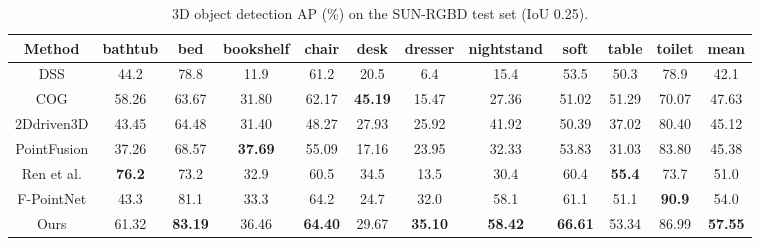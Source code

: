 \documentclass[letterpaper, 10 pt, conference]{ieeeconf}
\begin{document}
\begin{table*}[h]
	\begin{center}
		\begin{tabular}{c|cccccccccc|c}
			\hline
			\multicolumn{1}{c|}{Method}         & bathtub       & bed            & bookshelf      & chair          & desk           & dresser        & nightstand     & soft           & table         & toilet        & mean           \\ \hline
			DSS\cite{song2016deep}              & 44.2          & 78.8           & 11.9           & 61.2           & 20.5           & 6.4            & 15.4           & 53.5           & 50.3          & 78.9          & 42.1           \\
			COG\cite{ren2016three}              & 58.26         & 63.67          & 31.80          & 62.17          & \textbf{45.19} & 15.47          & 27.36          & 51.02          & 51.29         & 70.07         & 47.63          \\
			2Ddriven3D\cite{lahoud20172d}       & 43.45         & 64.48          & 31.40          & 48.27          & 27.93          & 25.92          & 41.92          & 50.39          & 37.02         & 80.40         & 45.12          \\
			PointFusion\cite{xu2018pointfusion} & 37.26         & 68.57          & \textbf{37.69} & 55.09          & 17.16          & 23.95          & 32.33          & 53.83          & 31.03         & 83.80         & 45.38          \\
			Ren et al.\cite{ren20183d}          & \textbf{76.2} & 73.2           & 32.9           & 60.5           & 34.5           & 13.5           & 30.4           & 60.4           & \textbf{55.4} & 73.7          & 51.0           \\
			F-PointNet\cite{qi2018frustum}      & 43.3          & 81.1           & 33.3           & 64.2           & 24.7           & 32.0           & 58.1           & 61.1           & 51.1          & \textbf{90.9} & 54.0           \\ \hline
			Ours                                & 61.32         & \textbf{83.19} & 36.46          & \textbf{64.40} & 29.67          & \textbf{35.10} & \textbf{58.42} & \textbf{66.61} & 53.34         & 86.99         & \textbf{57.55} \\ \hline
		\end{tabular}
		\caption{3D object detection AP (\%) on the SUN-RGBD test set (IoU 0.25). }
		\label{Tab:SUNRGBD_TEST}
		\vspace{-0.5cm}
	\end{center}

\end{table*}
\end{document}
